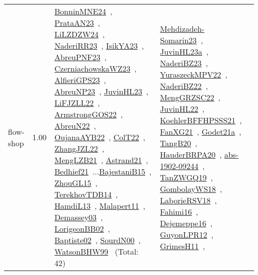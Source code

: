 {\begin{longtable}{p{3cm}r>{\raggedright\arraybackslash}p{6cm}>{\raggedright\arraybackslash}p{6cm}>{\raggedright\arraybackslash}p{8cm}}
\index{flow-shop}\index{Concepts!flow-shop}flow-shop &  1.00 & \href{../works/BonninMNE24.pdf}{BonninMNE24}~\cite{BonninMNE24}, \href{../works/PrataAN23.pdf}{PrataAN23}~\cite{PrataAN23}, \href{../works/LiLZDZW24.pdf}{LiLZDZW24}~\cite{LiLZDZW24}, \href{../works/NaderiRR23.pdf}{NaderiRR23}~\cite{NaderiRR23}, \href{../works/IsikYA23.pdf}{IsikYA23}~\cite{IsikYA23}, \href{../works/AbreuPNF23.pdf}{AbreuPNF23}~\cite{AbreuPNF23}, \href{../works/CzerniachowskaWZ23.pdf}{CzerniachowskaWZ23}~\cite{CzerniachowskaWZ23}, \href{../works/AlfieriGPS23.pdf}{AlfieriGPS23}~\cite{AlfieriGPS23}, \href{../works/AbreuNP23.pdf}{AbreuNP23}~\cite{AbreuNP23}, \href{../works/JuvinHL23.pdf}{JuvinHL23}~\cite{JuvinHL23}, \href{../works/LiFJZLL22.pdf}{LiFJZLL22}~\cite{LiFJZLL22}, \href{../works/ArmstrongGOS22.pdf}{ArmstrongGOS22}~\cite{ArmstrongGOS22}, \href{../works/AbreuN22.pdf}{AbreuN22}~\cite{AbreuN22}, \href{../works/OujanaAYB22.pdf}{OujanaAYB22}~\cite{OujanaAYB22}, \href{../works/ColT22.pdf}{ColT22}~\cite{ColT22}, \href{../works/ZhangJZL22.pdf}{ZhangJZL22}~\cite{ZhangJZL22}, \href{../works/MengLZB21.pdf}{MengLZB21}~\cite{MengLZB21}, \href{../works/Astrand21.pdf}{Astrand21}~\cite{Astrand21}, \href{../works/Bedhief21.pdf}{Bedhief21}~\cite{Bedhief21}...\href{../works/BajestaniB15.pdf}{BajestaniB15}~\cite{BajestaniB15}, \href{../works/ZhouGL15.pdf}{ZhouGL15}~\cite{ZhouGL15}, \href{../works/TerekhovTDB14.pdf}{TerekhovTDB14}~\cite{TerekhovTDB14}, \href{../works/HamdiL13.pdf}{HamdiL13}~\cite{HamdiL13}, \href{../works/Malapert11.pdf}{Malapert11}~\cite{Malapert11}, \href{../works/Demassey03.pdf}{Demassey03}~\cite{Demassey03}, \href{../works/LorigeonBB02.pdf}{LorigeonBB02}~\cite{LorigeonBB02}, \href{../works/Baptiste02.pdf}{Baptiste02}~\cite{Baptiste02}, \href{../works/SourdN00.pdf}{SourdN00}~\cite{SourdN00}, \href{../works/WatsonBHW99.pdf}{WatsonBHW99}~\cite{WatsonBHW99} (Total: 42) & \href{../works/Mehdizadeh-Somarin23.pdf}{Mehdizadeh-Somarin23}~\cite{Mehdizadeh-Somarin23}, \href{../works/JuvinHL23a.pdf}{JuvinHL23a}~\cite{JuvinHL23a}, \href{../works/NaderiBZ23.pdf}{NaderiBZ23}~\cite{NaderiBZ23}, \href{../works/YuraszeckMPV22.pdf}{YuraszeckMPV22}~\cite{YuraszeckMPV22}, \href{../works/NaderiBZ22.pdf}{NaderiBZ22}~\cite{NaderiBZ22}, \href{../works/MengGRZSC22.pdf}{MengGRZSC22}~\cite{MengGRZSC22}, \href{../works/JuvinHL22.pdf}{JuvinHL22}~\cite{JuvinHL22}, \href{../works/KoehlerBFFHPSSS21.pdf}{KoehlerBFFHPSSS21}~\cite{KoehlerBFFHPSSS21}, \href{../works/FanXG21.pdf}{FanXG21}~\cite{FanXG21}, \href{../works/Godet21a.pdf}{Godet21a}~\cite{Godet21a}, \href{../works/TangB20.pdf}{TangB20}~\cite{TangB20}, \href{../works/HauderBRPA20.pdf}{HauderBRPA20}~\cite{HauderBRPA20}, \href{../works/abs-1902-09244.pdf}{abs-1902-09244}~\cite{abs-1902-09244}, \href{../works/TanZWGQ19.pdf}{TanZWGQ19}~\cite{TanZWGQ19}, \href{../works/GombolayWS18.pdf}{GombolayWS18}~\cite{GombolayWS18}, \href{../works/LaborieRSV18.pdf}{LaborieRSV18}~\cite{LaborieRSV18}, \href{../works/Fahimi16.pdf}{Fahimi16}~\cite{Fahimi16}, \href{../works/Dejemeppe16.pdf}{Dejemeppe16}~\cite{Dejemeppe16}, \href{../works/GuyonLPR12.pdf}{GuyonLPR12}~\cite{GuyonLPR12}, \href{../works/GrimesH11.pdf}{GrimesH11}~\cite{GrimesH11}, 
\end{longtable}}
